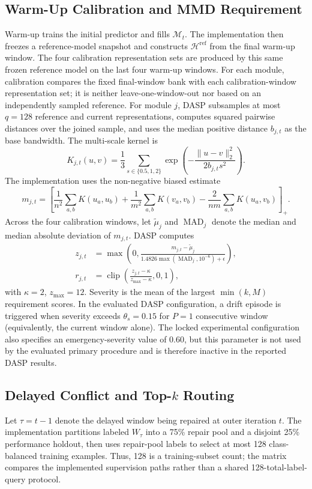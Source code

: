 \documentclass{ieeeaccess}
\begin{document}
\subsection{Warm-Up Calibration and MMD Requirement}
Warm-up trains the initial predictor and fills $\mathcal{M}_t$. The implementation then freezes a reference-model snapshot and constructs $\mathcal{H}^{\mathrm{ref}}$ from the final warm-up window. The four calibration representation sets are produced by this same frozen reference model on the last four warm-up windows. For each module, calibration compares the fixed final-window bank with each calibration-window representation set; it is neither leave-one-window-out nor based on an independently sampled reference. For module $j$, DASP subsamples at most $q=128$ reference and current representations, computes squared pairwise distances over the joined sample, and uses the median positive distance $b_{j,t}$ as the base bandwidth. The multi-scale kernel is
\begin{equation}
K_{j,t}(u,v)=\frac{1}{3}\sum_{s\in\{0.5,1,2\}}
\exp\left(-\frac{\lVert u-v\rVert_2^2}{2b_{j,t}s^2}\right).
\label{eq:multiscale-kernel}
\end{equation}
The implementation uses the non-negative biased estimate
\begin{equation}
m_{j,t}=\left[\frac{1}{n^2}\sum_{a,b}K(u_a,u_b)
+\frac{1}{m^2}\sum_{a,b}K(v_a,v_b)
-\frac{2}{nm}\sum_{a,b}K(u_a,v_b)\right]_+.
\label{eq:mmd}
\end{equation}
Across the four calibration windows, let $\widetilde\mu_j$ and $\operatorname{MAD}_j$ denote the median and median absolute deviation of $m_{j,t}$. DASP computes
\begin{align}
z_{j,t}&=\max\left(0,\frac{m_{j,t}-\widetilde\mu_j}
{1.4826\max(\operatorname{MAD}_j,10^{-6})+\epsilon}\right),\\
r_{j,t}&=\operatorname{clip}\left(
\frac{z_{j,t}-\kappa}{z_{\max}-\kappa},0,1\right),
\label{eq:requirement}
\end{align}
with $\kappa=2$, $z_{\max}=12$. Severity is the mean of the largest $\min(k,M)$ requirement scores. In the evaluated DASP configuration, a drift episode is triggered when severity exceeds $\theta_s=0.15$ for $P=1$ consecutive window (equivalently, the current window alone). The locked experimental configuration also specifies an emergency-severity value of $0.60$, but this parameter is not used by the evaluated primary procedure and is therefore inactive in the reported DASP results.

\subsection{Delayed Conflict and Top-$k$ Routing}
Let $\tau=t-1$ denote the delayed window being repaired at outer iteration $t$. The implementation partitions labeled $W_{\tau}$ into a 75\% repair pool and a disjoint 25\% performance holdout, then uses repair-pool labels to select at most 128 class-balanced training examples. Thus, 128 is a training-subset count; the matrix compares the implemented supervision paths rather than a shared 128-total-label-query protocol.
\end{document}
